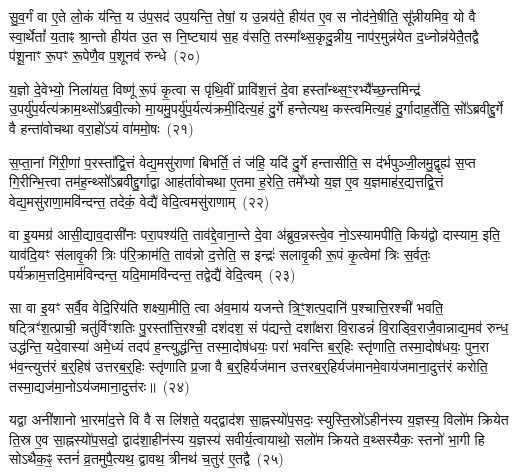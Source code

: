 {\anuvakamend[{अ॒सि॒ष्य॒तीति॑ जुहु॒याथ्सा॒यं प्रा॑तरुप॒सद॒श्चतु॑र्विꣳशतिः॒ सञ्च॒तुरो\-ऽग्रे॒ षोड॑श च}]}

सु॒व॒र्गं वा ए॒ते लो॒कं य॑न्ति॒ य उ॑प॒सद॑ उप॒यन्ति॒ तेषां॒ य उ॒न्नय॑ते॒ हीय॑त ए॒व स नोद॑ने॒षीति॒ सू᳚न्नीयमिव॒ यो वै स्वा॒र्थेतां᳚ य॒ताꣴ श्रा॒न्तो हीय॑त उ॒त स नि॒ष्ट्याय॑ स॒ह व॑सति॒ तस्मा᳚थ्स॒कृदु॒न्नीय॒ नाप॑र॒मुन्न॑येत द॒ध्नोन्न॑येतै॒तद्वै प॑शू॒नाꣳ रू॒पꣳ रू॒पेणै॒व प॒शूनव॑ रुन्धे~(२०)\ip

य॒ज्ञो दे॒वेभ्यो॒ निला॑यत॒ विष्णू॑ रू॒पं कृ॒त्वा स पृ॑थि॒वीं प्रावि॑श॒त्तं दे॒वा हस्ता᳚न्थ्स॒ꣳ॒रभ्यै᳚च्छ॒न्तमिन्द्र॑ उ॒पर्यु॑प॒र्यत्य॑क्राम॒थ्सो᳚\-ऽब्रवी॒त्को मा॒यमु॒पर्यु॑प॒र्यत्य॑क्रमी॒दित्य॒हं दु॒र्गे हन्तेत्यथ॒ कस्त्वमित्य॒हं दु॒र्गादाह॒र्तेति॒ सो᳚\-ऽब्रवीद्दु॒र्गे वै हन्ता॑वोचथा वरा॒हो॑\-ऽयं वा॑ममो॒षः~(२१)\ip

स॒प्ता॒नां गि॑री॒णां प॒रस्ता᳚द्वि॒त्तं वेद्य॒मसु॑राणां बिभर्ति॒ तं ज॑हि॒ यदि॑ दु॒र्गे हन्तासीति॒ स द॑र्भपुञ्जी॒लमु॒द्वृह्य॑ स॒प्त गि॒रीन्भि॒त्त्वा तम॑ह॒न्थ्सो᳚\-ऽब्रवीद्दु॒र्गाद्वा आह॑र्तावोचथा ए॒तमा ह॒रेति॒ तमे᳚भ्यो य॒ज्ञ ए॒व य॒ज्ञमाह॑र॒द्यत्तद्वि॒त्तं वेद्य॒मसु॑राणा॒मवि॑न्दन्त॒ तदेकं॒ वेद्यै॑ वेदि॒त्वमसु॑राणाम्~(२२)\ip

वा इ॒यमग्र॑ आसी॒द्याव॒दासी॑नः परा॒पश्य॑ति॒ ताव॑द्दे॒वाना॒न्ते दे॒वा अ॑ब्रुव॒न्नस्त्वे॒व नो॒\-ऽस्यामपीति॒ किय॑द्वो दास्याम॒ इति॒ याव॑दि॒यꣳ स॑लावृ॒की त्रिः प॑रि॒क्राम॑ति॒ ताव॑न्नो द॒त्तेति॒ स इन्द्रः॑ सलावृ॒की रू॒पं कृ॒त्वेमां त्रिः स॒र्वतः॒ पर्य॑क्राम॒त्तदि॒माम॑विन्दन्त॒ यदि॒मामवि॑न्दन्त॒ तद्वेद्यै॑ वेदि॒त्वम्~(२३)\ip

सा वा इ॒यꣳ सर्वै॒व वेदि॒रिय॑ति शक्ष्या॒मीति॒ त्वा अ॑व॒माय॑ यजन्ते त्रि॒ꣳ॒शत्प॒दानि॑ प॒श्चात्ति॒रश्ची॑ भवति॒ षट्त्रिꣳ॑श॒त्प्राची॒ चतु॑र्विꣳशतिः पु॒रस्ता᳚त्ति॒रश्ची॒ दश॑दश॒ सं प॑द्यन्ते॒ दशा᳚क्षरा वि॒राडन्नं॑ वि॒राड्वि॒राजै॒वान्नाद्य॒मव॑ रुन्ध॒ उद्ध॑न्ति॒ यदे॒वास्या॑ अमे॒ध्यं तदप॑ ह॒न्त्युद्ध॑न्ति॒ तस्मा॒दोष॑धयः॒ परा॑ भवन्ति ब॒र्॒\mbox{}हिः स्तृ॑णाति॒ तस्मा॒दोष॑धयः॒ पुन॒रा भ॑व॒न्त्युत्त॑रं ब॒र्॒\mbox{}हिष॑ उत्तरब॒र्॒\mbox{}हिः स्तृ॑णाति प्र॒जा वै ब॒र्॒\mbox{}हिर्यज॑मान उत्तरब॒र्॒\mbox{}हिर्यज॑मानमे॒वाय॑जमाना॒दुत्त॑रं करोति॒ तस्मा॒द्यज॑मा॒नो\-ऽय॑जमाना॒दुत्त॑रः॥~(२४)\ip

{}

यद्वा अनी॑शानो भा॒रमा॑द॒त्ते वि वै स लि॑शते॒ यद्द्वाद॑श सा॒ह्नस्यो॑प॒सदः॒ स्युस्ति॒स्रो॑\-ऽहीन॑स्य य॒ज्ञस्य॒ विलो॑म क्रियेत ति॒स्र ए॒व सा॒ह्नस्यो॑प॒सदो॒ द्वाद॑शा॒हीन॑स्य य॒ज्ञस्य॑ सवीर्य॒त्वायाथो॒ सलो॑म क्रियते व॒थ्सस्यैकः॒ स्तनो॑ भा॒गी हि सो\-ऽथैक॒ꣴ॒ स्तनं॑ व्र॒तमुपै॒त्यथ॒ द्वावथ॒ त्रीनथ॑ च॒तुर॑ ए॒तद्वै~(२५)\ip

